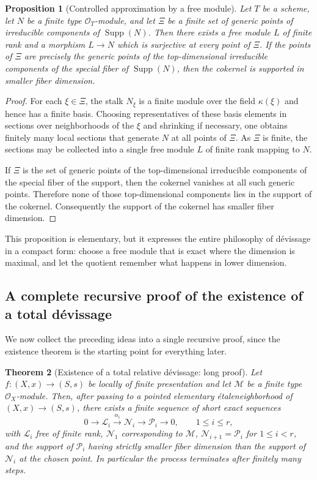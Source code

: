 \documentclass[11pt,oneside]{article}
\newtheorem{theorem}{Theorem}[section]
\newtheorem{proposition}[theorem]{Proposition}
\newcommand{\Lcal}{\mathcal L}
\newcommand{\M}{\mathcal M}
\newcommand{\N}{\mathcal N}
\newcommand{\Pcal}{\mathcal P}
\newcommand{\OO}{\mathcal O}
\newcommand{\Supp}{\operatorname{Supp}}
\newcommand{\etale}{\'etale}
\begin{document}
\begin{proposition}[Controlled approximation by a free module]\label{prop:controlled-approximation}
Let $T$ be a scheme, let $N$ be a finite type $\OO_T$-module, and let $\Xi$ be a finite set of generic points of irreducible components of $\Supp(N)$.  Then there exists a free module $L$ of finite rank and a morphism $L\to N$ which is surjective at every point of $\Xi$.  If the points of $\Xi$ are precisely the generic points of the top-dimensional irreducible components of the special fiber of $\Supp(N)$, then the cokernel is supported in smaller fiber dimension.
\end{proposition}

\begin{proof}
For each $\xi\in \Xi$, the stalk $N_\xi$ is a finite module over the field $\kappa(\xi)$ and hence has a finite basis.  Choosing representatives of these basis elements in sections over neighborhoods of the $\xi$ and shrinking if necessary, one obtains finitely many local sections that generate $N$ at all points of $\Xi$.  As $\Xi$ is finite, the sections may be collected into a single free module $L$ of finite rank mapping to $N$.

If $\Xi$ is the set of generic points of the top-dimensional irreducible components of the special fiber of the support, then the cokernel vanishes at all such generic points.  Therefore none of those top-dimensional components lies in the support of the cokernel.  Consequently the support of the cokernel has smaller fiber dimension.
\end{proof}

This proposition is elementary, but it expresses the entire philosophy of d\'evissage in a compact form: choose a free module that is exact where the dimension is maximal, and let the quotient remember what happens in lower dimension.

\subsection{A complete recursive proof of the existence of a total d\'evissage}

We now collect the preceding ideas into a single recursive proof, since the existence theorem is the starting point for everything later.

\begin{theorem}[Existence of a total relative d\'evissage: long proof]\label{thm:devissage-complete-long}
Let $f\colon (X,x)\to (S,s)$ be locally of finite presentation and let $\M$ be a finite type $\OO_X$-module.  Then, after passing to a pointed elementary \etale neighborhood of $(X,x)\to(S,s)$, there exists a finite sequence of short exact sequences
\[
0\to \Lcal_i\xrightarrow{\alpha_i}\N_i\to \Pcal_i\to 0,
\qquad 1\le i\le r,
\]
with $\Lcal_i$ free of finite rank, $\N_1$ corresponding to $\M$, $\N_{i+1}=\Pcal_i$ for $1\le i<r$, and the support of $\Pcal_i$ having strictly smaller fiber dimension than the support of $\N_i$ at the chosen point.  In particular the process terminates after finitely many steps.
\end{theorem}
\end{document}
